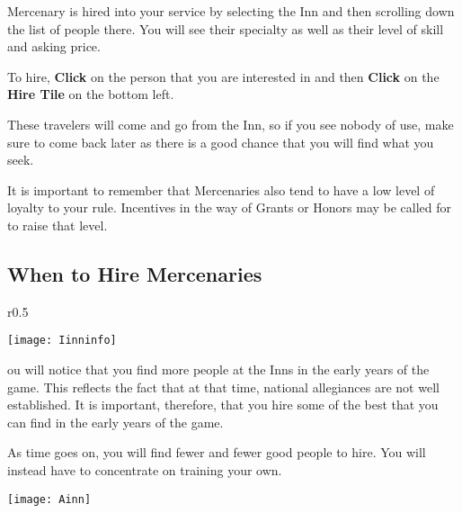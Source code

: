  Mercenary is hired into your service by selecting the Inn and then scrolling down the list of people there. You will see their specialty as well as their level of skill and asking price.

To hire, \textbf{Click} on the person that you are interested in and then \textbf{Click} on the \textbf{Hire Tile} on the bottom left.

These travelers will come and go from the Inn, so if you see nobody of use, make sure to come back later as there is a good chance that you will find what you seek.

It is important to remember that Mercenaries also tend to have a low level of loyalty to your rule. Incentives in the way of Grants or Honors may be called for to raise that level.

\subsection{\textsf{When to Hire Mercenaries}}

\begin{wrapfigure}{r}{0.5\textwidth}
	\vspace{-20pt}
	\begin{center}
		\texttt{[image: Iinninfo]} %
	\end{center}
	\vspace{-20pt}
\end{wrapfigure}

ou will notice that you find more people at the Inns in the early years of the game. This reflects the fact that at that time, national allegiances are not well established. It is important, therefore, that you hire some of the best that you can find in the early years of the game.

As time goes on, you will find fewer and fewer good people to hire. You will instead have to concentrate on training your own.

\vspace{1.5in}

\begin{center}
	\texttt{[image: Ainn]}
\end{center}